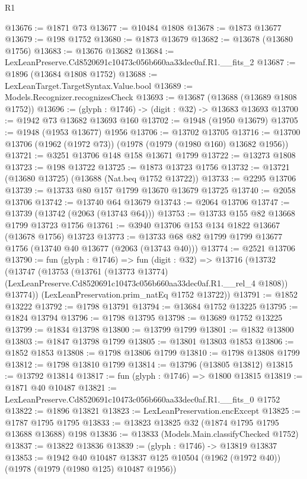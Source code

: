 \begin{lexlean}{R1}
\begin{coremodule}
@13676 := @1871 @73
@13677 := @10484 @1808
@13678 := @1873 @13677
@13679 := @198 @1752
@13680 := @1873 @13679
@13682 := @13678 (@13680 @1756)
@13683 := @13676 @13682
@13684 := LexLeanPreserve.Cd8520691c10473c056b660aa33dec0af.R1.__fits_2
@13687 := @1896 (@13684 @1808 @1752)
@13688 := LexLeanTarget.TargetSyntax.Value.bool
@13689 := Models.Recognizer.recognizesCheck
@13693 := @13687 (@13688 (@13689 @1808 @1752))
@13696 := (glyph : @1746) -> (digit : @32) -> @13683 @13693
@13700 := @1942 @73 @13682 @13693 @160
@13702 := @1948 (@1950 @13679)
@13705 := @1948 (@1953 @13677) @1956
@13706 := @13702 @13705
@13716 := @13700 @13706 (@1962 (@1972 @73)) (@1978 (@1979 (@1980 @160) @13682 @1956))
@13721 := @3251 @13706 @148 @158 @13671 @1799
@13722 := @13273 @1808
@13723 := @198 @13722
@13725 := @1873 @13723 @1756
@13732 := @13721 (@13680 @13725) (@13688 (Nat.beq @1752 @13722))
@13733 := @2295 @13706
@13739 := @13733 @80 @157 @1799 @13670 @13679 @13725
@13740 := @2058 @13706
@13742 := @13740 @64 @13679
@13743 := @2064 @13706
@13747 := @13739 (@13742 (@2063 (@13743 @64)))
@13753 := @13733 @155 @82 @13668 @1799 @13723 @1756
@13761 := @3940 @13706 @153 @134 @1822 @13667 (@13678 @1756) @13723
@13773 := @13733 @68 @82 @1799 @1799 @13677 @1756 (@13740 @40 @13677 (@2063 (@13743 @40)))
@13774 := @2521 @13706
@13790 := fun (glyph : @1746) =>
  fun (digit : @32) =>
  @13716
    (@13732
      (@13747
        (@13753
          (@13761
            (@13773 @13774)
            (LexLeanPreserve.Cd8520691c10473c056b660aa33dec0af.R1.__rel_4 @1808))
          @13774))
      (LexLeanPreservation.prim_natEq @1752 @13722))
@13791 := @1852 @13222
@13792 := @1798 @13791
@13794 := @13684 @1752 @13225
@13795 := @1824 @13794
@13796 := @1798 @13795
@13798 := @13689 @1752 @13225
@13799 := @1834 @13798
@13800 := @13799 @1799
@13801 := @1832 @13800
@13803 := @1847 @13798 @1799
@13805 := @13801 @13803 @1853
@13806 := @1852 @1853
@13808 := @1798 @13806 @1799
@13810 := @1798 @13808 @1799
@13812 := @1798 @13810 @1799
@13814 := @13796 (@13805 @13812)
@13815 := @13792 @13814
@13817 := fun (glyph : @1746) => @1800 @13815
@13819 := @1871 @40 @10487
@13821 := LexLeanPreserve.Cd8520691c10473c056b660aa33dec0af.R1.__fits_0 @1752
@13822 := @1896 @13821
@13823 := LexLeanPreservation.encExcept
@13825 := @1787 @1795 @1795
@13833 := @13823 @13825 @32 (@1874 @1795 @1795 @13688 @13688) @198
@13836 := @13833 (Models.Main.classifyChecked @1752)
@13837 := @13822 @13836
@13839 := (glyph : @1746) -> @13819 @13837
@13853 := @1942
    @40
    @10487
    @13837
    @125
    @10504
    (@1962 (@1972 @40))
    (@1978 (@1979 (@1980 @125) @10487 @1956))

\end{coremodule}
\end{lexlean}
